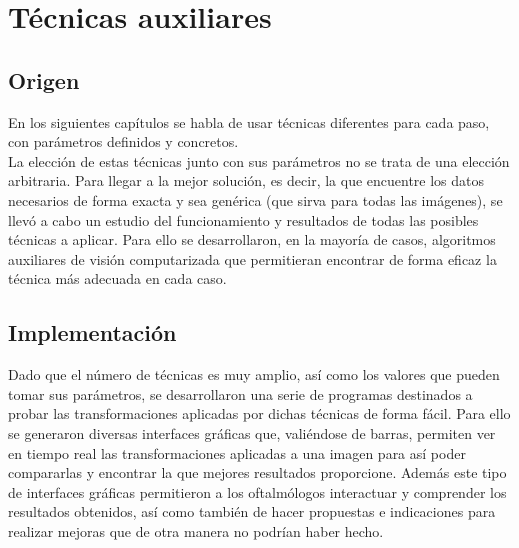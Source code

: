 \chapter{Técnicas auxiliares}
\section{Origen}
En los siguientes capítulos se habla de usar técnicas diferentes
para cada paso, con parámetros definidos y concretos. \\
La elección de estas técnicas junto con sus parámetros no se trata de
una elección arbitraria. Para llegar a la mejor solución, es decir, la
que encuentre los datos necesarios de forma exacta y sea genérica (que
sirva para todas las imágenes), se llevó a cabo un estudio del
funcionamiento y resultados de todas las posibles técnicas a aplicar.
Para ello se desarrollaron, en la mayoría de casos, algoritmos
auxiliares de visión computarizada que permitieran encontrar de forma
eficaz la técnica más adecuada en cada caso.

\section{Implementación}
Dado que el número de técnicas es muy amplio, así como los valores que
pueden tomar sus parámetros, se desarrollaron una serie de programas
destinados a probar las transformaciones aplicadas por dichas técnicas
de forma fácil. Para ello se generaron diversas interfaces gráficas
que, valiéndose de barras, permiten ver en tiempo real las
transformaciones aplicadas a una imagen para así poder compararlas y
encontrar la que mejores resultados proporcione. Además este tipo de
interfaces gráficas permitieron a los oftalmólogos interactuar y
comprender los resultados obtenidos, así como también de hacer
propuestas e indicaciones para realizar mejoras que de otra manera no
podrían haber hecho.
